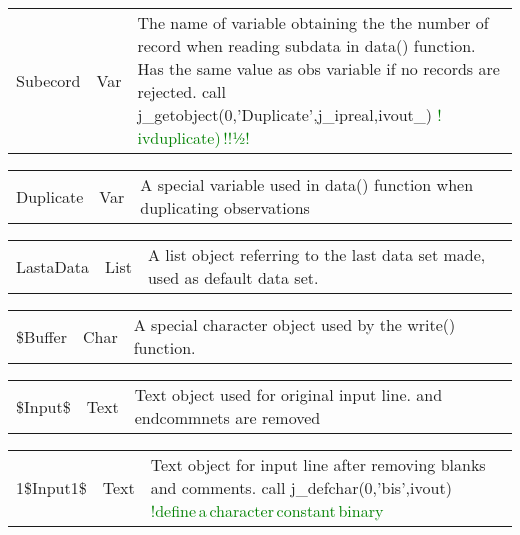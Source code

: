 \vspace{-1.51em}
\begin{table}[H]
 \begin{tabular}{ m{}  m{} p{}}
 Subecord& Var & The name of variable obtaining the the number of
 record when reading subdata in \textcolor{VioletRed}{data}() function. Has the same value as obs variable
 if no records are rejected.
call j\_getobject(0,'Duplicate',j\_ipreal,ivout\_) \textcolor{green}{!\,ivduplicate)\,!!½!}
\end{tabular}
\end{table}
\vspace{-1.51em}
\begin{table}[H]
 \begin{tabular}{ m{}  m{} p{}}
Duplicate& Var& A special variable used in \textcolor{VioletRed}{data}() function when duplicating observations
\end{tabular}
\end{table}
\vspace{-1.51em}
\begin{table}[H]
 \begin{tabular}{ m{}  m{} p{}}
 LastaData &List&	A list object referring to the last data set made, used as default data set.
\end{tabular}
\end{table}
\vspace{-1.51em}
\begin{table}[H]
 \begin{tabular}{ m{}  m{} p{}}
 \$Buffer&Char& A special character object used by the \textcolor{VioletRed}{write}() function.
\end{tabular}
\end{table}
\vspace{-1.51em}
\begin{table}[H]
 \begin{tabular}{ m{}  m{} p{}}
 \$Input\$& Text & Text object used for original input line.
and endcommnets are removed
\end{tabular}
\end{table}
\vspace{-1.51em}
\begin{table}[H]
 \begin{tabular}{ m{}  m{} p{}}
1\$Input1\$ &Text& Text object for input line after removing blanks and comments.
call j\_defchar(0,'bis',ivout) \textcolor{green}{!define\,a\,character\,constant\,binary}
\end{tabular}
\end{table}
